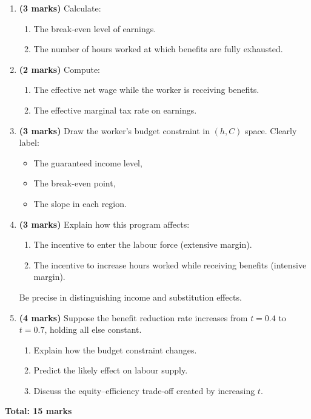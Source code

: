 \documentclass[12pt]{article}
\begin{document}
\begin{enumerate}

\item[(a)] \textbf{(3 marks)}  
Calculate:
\begin{enumerate}
\item The break-even level of earnings.
\item The number of hours worked at which benefits are fully exhausted.
\end{enumerate}

\item[(b)] \textbf{(2 marks)}  
Compute:
\begin{enumerate}
\item The effective net wage while the worker is receiving benefits.
\item The effective marginal tax rate on earnings.
\end{enumerate}

\item[(c)] \textbf{(3 marks)}  
Draw the worker’s budget constraint in $(h, C)$ space. Clearly label:
\begin{itemize}
\item The guaranteed income level,
\item The break-even point,
\item The slope in each region.
\end{itemize}

\item[(d)] \textbf{(3 marks)}  
Explain how this program affects:
\begin{enumerate}
\item The incentive to enter the labour force (extensive margin).
\item The incentive to increase hours worked while receiving benefits (intensive margin).
\end{enumerate}
Be precise in distinguishing income and substitution effects.

\item[(e)] \textbf{(4 marks)}  
Suppose the benefit reduction rate increases from $t = 0.4$ to $t = 0.7$, holding all else constant.
\begin{enumerate}[label=(\roman*)]
\item Explain how the budget constraint changes.
\item Predict the likely effect on labour supply.
\item Discuss the equity--efficiency trade-off created by increasing $t$.
\end{enumerate}

\end{enumerate}

\vfill
\textbf{Total: 15 marks}
\end{document}
